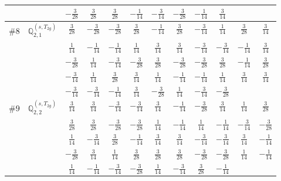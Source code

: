 \documentclass[fleqn,9pt,landscape]{jsarticle}
\begin{document}
\begin{center}
\begin{longtable}{lcccccccccc}
& $ - \frac{3}{28} $ & $ \frac{3}{28} $ & $ \frac{3}{28} $ & $ - \frac{1}{14} $ & $ - \frac{3}{14} $ & $ - \frac{3}{28} $ & $ - \frac{1}{14} $ & $ \frac{3}{14} $ & $  $ & $  $ \\ \hline
$ \#8\quad \mathbb{Q}_{2,1}^{(s,T_{2g})} $ & $ \frac{3}{28} $ & $ - \frac{3}{28} $ & $ - \frac{3}{28} $ & $ \frac{3}{28} $ & $ - \frac{1}{14} $ & $ \frac{3}{28} $ & $ - \frac{3}{14} $ & $ \frac{1}{14} $ & $ \frac{3}{28} $ & $ \frac{3}{14} $ \\
& $ \frac{1}{14} $ & $ - \frac{1}{14} $ & $ - \frac{1}{14} $ & $ \frac{1}{14} $ & $ \frac{3}{14} $ & $ \frac{3}{14} $ & $ - \frac{3}{14} $ & $ - \frac{3}{14} $ & $ - \frac{1}{14} $ & $ \frac{3}{14} $ \\
& $ - \frac{3}{28} $ & $ \frac{1}{14} $ & $ - \frac{3}{14} $ & $ - \frac{3}{28} $ & $ \frac{3}{28} $ & $ - \frac{3}{28} $ & $ - \frac{3}{28} $ & $ \frac{3}{28} $ & $ - \frac{1}{14} $ & $ \frac{3}{28} $ \\
& $ - \frac{3}{14} $ & $ \frac{1}{14} $ & $ \frac{3}{28} $ & $ \frac{3}{14} $ & $ \frac{1}{14} $ & $ - \frac{1}{14} $ & $ - \frac{1}{14} $ & $ \frac{1}{14} $ & $ \frac{3}{14} $ & $ \frac{3}{14} $ \\
& $ - \frac{3}{14} $ & $ - \frac{3}{14} $ & $ - \frac{1}{14} $ & $ \frac{3}{14} $ & $ - \frac{3}{28} $ & $ \frac{1}{14} $ & $ - \frac{3}{14} $ & $ - \frac{3}{28} $ & $  $ & $  $ \\ \hline
$ \#9\quad \mathbb{Q}_{2,2}^{(s,T_{2g})} $ & $ \frac{3}{14} $ & $ \frac{3}{14} $ & $ - \frac{3}{14} $ & $ - \frac{3}{14} $ & $ \frac{3}{14} $ & $ - \frac{1}{14} $ & $ - \frac{3}{28} $ & $ \frac{3}{14} $ & $ \frac{1}{14} $ & $ \frac{3}{28} $ \\
& $ \frac{3}{28} $ & $ \frac{3}{28} $ & $ - \frac{3}{28} $ & $ - \frac{3}{28} $ & $ \frac{1}{14} $ & $ - \frac{1}{14} $ & $ \frac{1}{14} $ & $ - \frac{1}{14} $ & $ - \frac{3}{14} $ & $ - \frac{3}{28} $ \\
& $ \frac{1}{14} $ & $ - \frac{3}{14} $ & $ \frac{3}{28} $ & $ - \frac{1}{14} $ & $ \frac{3}{14} $ & $ \frac{3}{14} $ & $ - \frac{3}{14} $ & $ - \frac{3}{14} $ & $ \frac{3}{14} $ & $ - \frac{1}{14} $ \\
& $ - \frac{3}{28} $ & $ \frac{3}{14} $ & $ \frac{1}{14} $ & $ \frac{3}{28} $ & $ \frac{3}{28} $ & $ \frac{3}{28} $ & $ - \frac{3}{28} $ & $ - \frac{3}{28} $ & $ \frac{1}{14} $ & $ - \frac{1}{14} $ \\
& $ \frac{1}{14} $ & $ - \frac{1}{14} $ & $ - \frac{3}{14} $ & $ - \frac{3}{28} $ & $ \frac{1}{14} $ & $ - \frac{3}{14} $ & $ \frac{3}{28} $ & $ - \frac{1}{14} $ & $  $ & $  $ \\ \hline

\end{longtable}
\end{center}
\end{document}
